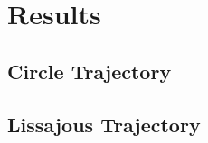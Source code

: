 \documentclass[paper=letter, fontsize=11pt]{scrartcl} %
\numberwithin{equation}{section} %
\numberwithin{figure}{section} %
\numberwithin{table}{section} %
\begin{document}
\section{Results}
\subsection{Circle Trajectory}

\subsection{Lissajous Trajectory}


{}


\end{document}
